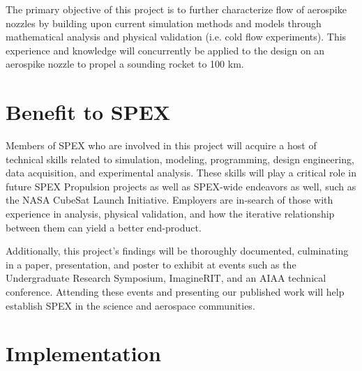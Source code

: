 \documentclass[conference]{IEEEtran} %
\begin{document}
	The primary objective of this project is to further characterize flow of aerospike nozzles by building upon current simulation methods and models through mathematical analysis and physical validation (i.e. cold flow experiments). This experience and knowledge will concurrently be applied to the design on an aerospike nozzle to propel a sounding rocket to 100 km. 
	
	
	
	\section{Benefit to SPEX}
	\label{sec:benefit}
	
	Members of SPEX who are involved in this project will acquire a host of technical skills related to simulation, modeling, programming, design engineering, data acquisition, and experimental analysis. These skills will play a critical role in future SPEX Propulsion projects as well as SPEX-wide endeavors as well, such as the NASA CubeSat Launch Initiative. Employers are in-search of those with experience in analysis, physical validation, and how the iterative relationship between them can yield a better end-product.
	
	Additionally, this project's findings will be thoroughly documented, culminating in a paper, presentation, and poster to exhibit at events such as the Undergraduate Research Symposium, ImagineRIT, and an AIAA technical conference. Attending these events and presenting our published work will help establish SPEX in the science and aerospace communities.
	
	\section{Implementation}
	\label{sec:implementation}
	
\end{document}
